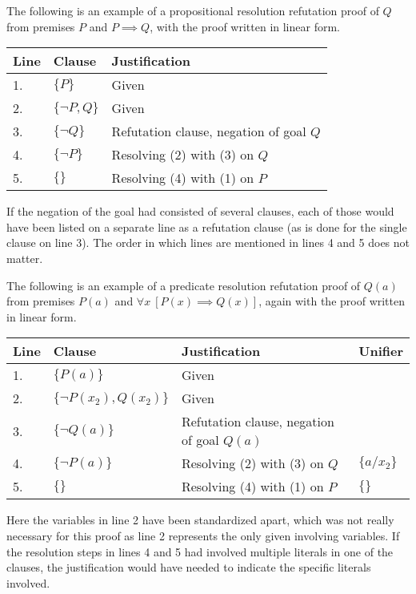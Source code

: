 \documentclass{article}
\begin{document}
\newpage

The following is an example of a propositional resolution refutation
proof of $Q$ from premises $P$ and $P \implies Q$, with the proof
written in linear form.
\begin{center}
  \begin{tabular}{lll}
    Line & Clause & Justification \\ \hline
    1. & $\{ P \}$ & Given \\
    2. & $\{ \neg P, Q \}$ & Given \\ \hline
    3. & $\{ \neg Q \}$ & Refutation clause, negation of goal $Q$ \\
    4. & $\{ \neg P \}$ & Resolving (2) with (3) on $Q$  \\
    5. & $\{ \}$ & Resolving (4) with (1) on $P$  \\ 
  \end{tabular}
\end{center}
If the negation of the goal had consisted of several clauses, each of
those would have been listed on a separate line as a refutation clause
(as is done for the single clause on line 3).  The order in which
lines are mentioned in lines 4 and 5 does not matter.

The following is an example of a predicate resolution refutation proof
of $Q(a)$ from premises $P(a)$ and $\forall x\ [P(x) \implies Q(x)]$,
again with the proof written in linear form.
\begin{center}
  \begin{tabular}{llll}
    Line & Clause & Justification & Unifier \\ \hline
    1. & $\{ P(a) \}$ & Given & \\
    2. & $\{ \neg P(x_2), Q(x_2) \}$ & Given & \\ \hline
    3. & $\{ \neg Q(a) \}$ & Refutation clause, negation of goal
                             $Q(a)$ & \\
    4. & $\{ \neg P(a) \}$ & Resolving (2) with (3) on $Q$ & $\{ a/x_2
                                                             \}$ \\
    5. & $\{ \}$ & Resolving (4) with (1) on $P$ & $\{ \}$  \\ 
  \end{tabular}
\end{center}
Here the variables in line 2 have been standardized apart, which was
not really necessary for this proof as line 2 represents the only
given involving variables.  If the resolution steps in lines 4 and 5
had involved multiple literals in one of the clauses, the
justification would have needed to indicate the specific literals
involved.
\end{document}
